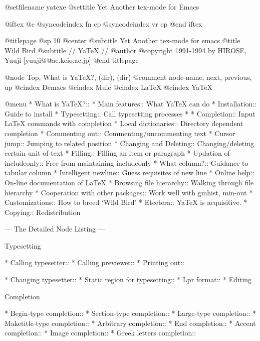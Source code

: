 \def\lang{jp} %

@setfilename yatexe
@settitle Yet Another tex-mode for Emacs

@iftex
@c @syncodeindex fn cp
@syncodeindex vr cp
@end iftex

@titlepage
@sp 10
@center
@subtitle Yet Another tex-mode for emacs
@title Wild Bird
@subtitle // YaTeX //
@author @copyright{} 1991-1994 by    HIROSE, Yuuji [yuuji@@ae.keio.ac.jp]
@end titlepage

@node Top, What is YaTeX?, (dir), (dir)
@comment  node-name,  next,  previous,  up
@cindex Demacs
@cindex Mule
@cindex LaTeX
@cindex YaTeX

@menu
* What is YaTeX?::              
* Main features::               What YaTeX can do
* Installation::                Guide to install
* Typesetting::                 Call typesetting processes
* %
* Completion::                  Input LaTeX commands with completion
* Local dictionaries::          Directory dependent completion
* Commenting out::              Commenting/uncommenting text
* Cursor jump::                 Jumping to related position
* Changing and Deleting::       Changing/deleting certain unit of text
* Filling::                     Filling an item or paragraph
* Updation of includeonly::     Free from maintaining includeonly
* What column?::                Guidance to tabular column
* Intelligent newline::         Guess requisites of new line
* Online help::                 On-line documentation of LaTeX
* Browsing file hierarchy::     Walking through file hierarchy
* Cooperation with other packages::  Work well with gmhist, min-out
* Customizations::              How to breed `Wild Bird'
* Etcetera::                    YaTeX is acquisitive.
* Copying::                     Redistribution

 --- The Detailed Node Listing ---

Typesetting

* Calling typesetter::          
* Calling previewer::           
* Printing out::                


* Changing typesetter::         
* Static region for typesetting::  
* Lpr format::                  
* Editing %

Completion

* Begin-type completion::       
* Section-type completion::     
* Large-type completion::       
* Maketitle-type completion::   
* Arbitrary completion::        
* End completion::              
* Accent completion::           
* Image completion::            
* Greek letters completion::    

